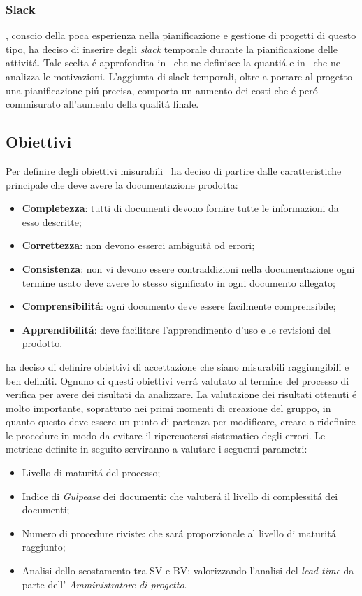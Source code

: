 \subsubsection{Slack}
\gruppo, conscio della poca esperienza nella pianificazione e gestione di progetti di questo tipo, ha deciso di inserire degli \textit{slack} temporale durante la pianificazione delle attivit\'a. Tale scelta \'e approfondita in \infoNDP ~che ne definisce la quanti\'a e in \infoPDP ~che ne analizza le motivazioni.
L'aggiunta di slack temporali, oltre a portare al progetto una pianificazione pi\'u precisa, comporta un aumento dei costi che \'e per\'o commisurato all'aumento della qualit\'a finale.
\subsection{Obiettivi}
Per definire degli obiettivi misurabili \gruppo ~ha deciso di partire dalle caratteristiche principale che deve avere la documentazione prodotta:
\begin{itemize}
\item \textbf{Completezza}: tutti di documenti devono fornire tutte le informazioni da esso descritte;
\item \textbf{Correttezza}: non devono esserci ambiguità od errori;
\item \textbf{Consistenza}: non vi devono essere contraddizioni nella documentazione ogni termine usato deve avere lo stesso significato in ogni documento allegato;
\item \textbf{Comprensibilit\'a}: ogni documento deve essere facilmente comprensibile;
\item \textbf{Apprendibilit\'a}: deve facilitare l’apprendimento d'uso e le revisioni del prodotto.
\end{itemize}
\gruppo{} ha deciso di definire obiettivi di accettazione che siano misurabili raggiungibili e ben definiti. Ognuno di questi obiettivi verr\'a valutato al termine del processo di verifica per avere dei risultati da analizzare. La valutazione dei risultati ottenuti \'e molto importante, soprattuto nei primi momenti di creazione del gruppo, in quanto questo deve essere un punto di partenza per modificare, creare o ridefinire le procedure in modo da evitare il ripercuotersi sistematico degli errori.
Le metriche definite in seguito serviranno a valutare i seguenti parametri:
\begin{itemize}
\item Livello di maturit\'a del processo;
\item Indice di \textit{Gulpease} dei documenti: che valuter\'a il livello di complessit\'a dei documenti;
\item Numero di procedure riviste: che sar\'a proporzionale al livello di maturit\'a raggiunto;
\item Analisi dello scostamento tra SV e BV: valorizzando l'analisi del \textit{lead time} da parte dell' \textit{Amministratore di progetto}.
\end{itemize}

